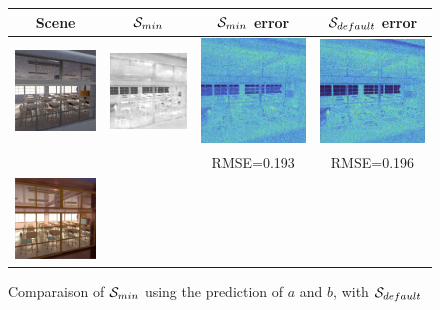 \documentclass{classeENS}
\begin{document}
\begin{figure}[H]
    \centering
    \caption{Comparaison of $\mathcal S_{min}$ using the prediction of $a$ and $b$, with $\mathcal S_{default}$}
    \begin{tabular}{|c|c|c|c|}
        \hline
        Scene & $\mathcal S_{min}$ & $\mathcal S_{min}$ error & $\mathcal S_{default}$ error\\
        \hline
        \includegraphics[width=35mm]{image/without/pimage.png}
        & \includegraphics[width=35mm]{image/without/psm.png}
        & \includegraphics[width=35mm]{image/without/perror.png}
        & \includegraphics[width=35mm]{image/without/RMSE_uni.png} \\
         &  & RMSE=0.193 & RMSE=0.196 \\
        \hline
        \includegraphics[width=35mm]{image/without/ppgt.png}

\end{tabular}
\end{figure}
\end{document}
